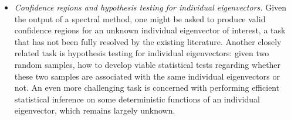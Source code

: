 \begin{itemize}
	\item {\em Confidence regions and hypothesis testing for individual eigenvectors.} Given the output of a spectral method, one might be asked to produce valid confidence regions for an unknown individual eigenvector of interest, a task that has not been fully resolved by the existing literature.  Another closely related task is hypothesis testing for individual eigenvectors: given two random samples, how to develop viable statistical tests regarding whether these two samples are associated with the same individual eigenvectors or not. 
		An even more challenging task is concerned with performing efficient statistical inference on some deterministic functions of an individual eigenvector, which remains largely unknown.    
	

  
  

		
\end{itemize}

